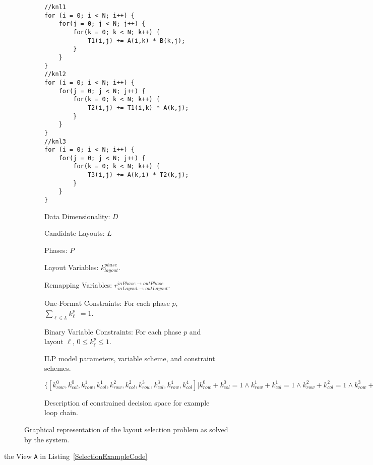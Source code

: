 \begin{figure}
\begin{subfigure}{0.4\columnwidth}
\begin{lstlisting}[caption={Example loop chain. The selection problem targets the \texttt{A} array. Code is shown using standard C++ for loops rather than RAJA kernels for the reader's familiarity.},label=SelectionExampleCode]
//knl1
for (i = 0; i < N; i++) {
	for(j = 0; j < N; j++) {
		for(k = 0; k < N; k++) {
			T1(i,j) += A(i,k) * B(k,j);
		}
	}
}
//knl2
for (i = 0; i < N; i++) {
	for(j = 0; j < N; j++) {
		for(k = 0; k < N; k++) {
			T2(i,j) += T1(i,k) * A(k,j);
		}
	}
}
//knl3
for (i = 0; i < N; i++) {
	for(j = 0; j < N; j++) {
		for(k = 0; k < N; k++) {
			T3(i,j) += A(k,i) * T2(k,j);
		}
	}
}

\end{lstlisting}
\end{subfigure}

\begin{subfigure}{\columnwidth}
Data Dimensionality: $D$

Candidate Layouts: $L$

Phases: $P$

Layout Variables: $k_{layout}^{phase}$.

Remapping Variables: $r_{inLayout \rightarrow outLayout}^{inPhase \rightarrow outPhase}$. 

One-Format Constraints: For each phase $p$, $\sum_{\ell \in L} k_{\ell}^{p} \ \ = 1$.

Binary Variable Constraints: For each phase $p$ and layout $\ell$, $0 \leq k_{\ell}^{p} \leq 1$.
\caption{ILP model parameters, variable scheme, and constraint schemes.}
\end{subfigure}

\begin{subfigure}{\columnwidth}

$\{[k_{row}^{0}, k_{col}^{0}, k_{row}^{1}, k_{col}^{1},k_{row}^{2}, k_{col}^{2},k_{row}^{3}, k_{col}^{3},k_{row}^{4}, k_{col}^{4}] \vert 
k_{row}^0 + k_{col}^0 = 1 \land 
k_{row}^1 + k_{col}^1 = 1 \land 
k_{row}^2 + k_{col}^2 = 1 \land 
k_{row}^3 + k_{col}^3 = 1 \land 
k_{row}^4 + k_{col}^4 = 1 \land 
0 \leq k_{row}^{0} \leq 1 \land
0 \leq k_{col}^{0} \leq 1 \land
0 \leq k_{row}^{1} \leq 1 \land
0 \leq k_{col}^{1} \leq 1 \land
0 \leq k_{row}^{2} \leq 1 \land
0 \leq k_{col}^{2} \leq 1 \land
0 \leq k_{row}^{3} \leq 1 \land
0 \leq k_{col}^{3} \leq 1 \land
0 \leq k_{row}^{4} \leq 1 \land
0 \leq k_{col}^{4} \leq 1 \}
$
\caption{Description of constrained decision space for example loop chain.}\label{SelectionExampleConstrainedSpace}
\end{subfigure}

\caption{Graphical representation of the layout selection problem as solved by the \FormatDecisions{} system.}
\end{figure}
 the View \verb.A. in Listing~\ref{SelectionExampleCode} 

